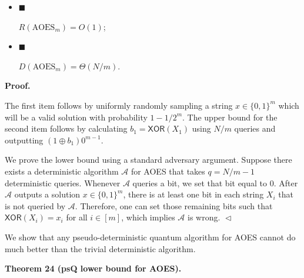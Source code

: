 \documentclass[10pt,a4paper]{article}
\begin{document}
\begin{itemize}


\item[] 
$\blacksquare$ 


$R({\text{AOES}}_{m})=O(1)$;\par





\item[] 
$\blacksquare$ 


$D({\text{AOES}}_{m})=\Theta(N/m)$.\par





\end{itemize}






\par\medskip\noindent\textbf{
\textbf{Proof}.}\par




The first item follows by uniformly randomly sampling a string $x\in\{0,1\}^{m}$ which will be a valid solution with probability $1-1/2^{m}$. The upper bound for the second item follows by calculating $b_{1}=\mathsf{XOR}(X_{1})$ using $N/m$ queries and outputting $(1\oplus b_{1})0^{m-1}$.\par




We prove the lower bound using a standard adversary argument. Suppose there exists a deterministic algorithm $\mathcal{A}$ for AOES that takes $q=N/m-1$ deterministic queries. Whenever $\mathcal{A}$ queries a bit, we set that bit equal to $0$. After $\mathcal{A}$ outputs a solution $x\in\{0,1\}^{m}$, there is at least one bit in each string $X_{i}$ that is not queried by $\mathcal{A}$. Therefore, one can set those remaining bits such that $\mathsf{XOR}(X_{i})=x_{i}$ for all $i\in[m]$, which implies $\mathcal{A}$ is wrong.
$\vartriangleleft$\par




We show that any pseudo-deterministic quantum algorithm for AOES cannot do much better than the trivial deterministic algorithm.\par





\par\medskip\noindent\textbf{
\textbf{Theorem 24}\textbf{ }(psQ lower bound for AOES)\textbf{.}
}\par
\end{document}
